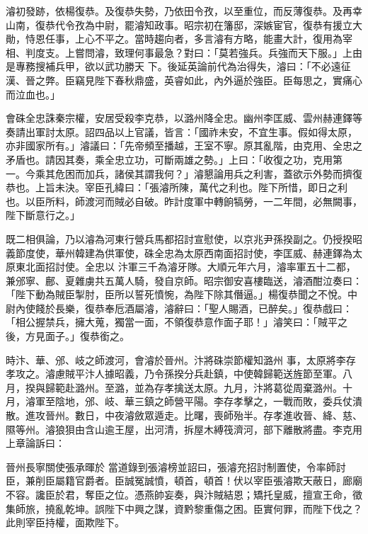 \begin{pinyinscope}
 濬初發跡，依楊復恭。及復恭失勢，乃依田令孜，以至重位，而反薄復恭。及再幸山南，復恭代令孜為中尉，罷濬知政事。昭宗初在籓邸，深嫉宦官，復恭有援立大勛，恃恩任事，上心不平之。當時趨向者，多言濬有方略，能畫大計，復用為宰相、判度支。上嘗問濬，致理何事最急？對曰：「莫若強兵。兵強而天下服。」上由是專務搜補兵甲，欲以武功勝天
 下。後延英論前代為治得失，濬曰：「不必遠征漢、晉之弊。臣竊見陛下春秋鼎盛，英睿如此，內外逼於強臣。臣每思之，實痛心而泣血也。」



 會硃全忠誅秦宗權，安居受殺李克恭，以潞州降全忠。幽州李匡威、雲州赫連鐸等奏請出軍討太原。詔四品以上官議，皆言：「國祚未安，不宜生事。假如得太原，亦非國家所有。」濬議曰：「先帝頻至播越，王室不寧。原其亂階，由克用、全忠之矛盾也。請因其奏，乘全忠立功，可斷兩雄之勢。」上曰：「收復之功，克用第
 一。今乘其危困而加兵，諸侯其謂我何？」濬懇論用兵之利害，蓋欲示外勢而擠復恭也。上旨未決。宰臣孔緯曰：「張濬所陳，萬代之利也。陛下所惜，即日之利也。以臣所料，師渡河而賊必自破。昨計度軍中轉餉犒勞，一二年間，必無闕事，陛下斷意行之。」



 既二相俱論，乃以濬為河東行營兵馬都招討宣慰使，以京兆尹孫揆副之。仍授揆昭義節度使，華州韓建為供軍使，硃全忠為太原西南面招討使，李匡威、赫連鐸為太原東北面招討使。全忠以
 汴軍三千為濬牙隊。大順元年六月，濬率軍五十二都，兼邠寧、鄜、夏雜虜共五萬人騎，發自京師。昭宗御安喜樓臨送，濬酒酣泣奏曰：「陛下動為賊臣掣肘，臣所以誓死憤惋，為陛下除其僭逼。」楊復恭聞之不悅。中尉內使餞於長樂，復恭奉卮酒屬濬，濬辭曰：「聖人賜酒，已醉矣。」復恭戲曰：「相公握禁兵，擁大蒐，獨當一面，不領復恭意作面子耶！」濬笑曰：「賊平之後，方見面子。」復恭銜之。



 時汴、華、邠、岐之師渡河，會濬於晉州。汴將硃崇節權知潞州
 事，太原將李存孝攻之。濬慮賊平汴人據昭義，乃令孫揆分兵赴鎮，中使韓歸範送旌節至軍。八月，揆與歸範赴潞州。至潞，並為存孝擒送太原。九月，汴將葛從周棄潞州。十月，濬軍至陰地，邠、岐、華三鎮之師營平陽。李存孝擊之，一戰而敗，委兵仗潰散。進攻晉州。數日，中夜濬斂眾遁走。比曙，喪師殆半。存孝進收晉、絳、慈、隰等州。濬狼狽由含山逾王屋，出河清，拆屋木縛筏濟河，部下離散將盡。李克用上章論訴曰：



 晉州長寧關使張承暉於
 當道錄到張濬榜並詔曰，張濬充招討制置使，令率師討臣，兼削臣屬籍官爵者。臣誠冤誠憤，頓首，頓首！伏以宰臣張濬欺天蔽日，廊廟不容。讒臣於君，奪臣之位。憑燕帥妄奏，與汴賊結恩；矯托皇威，擅宣王命，徵集師旅，撓亂乾坤。誤陛下中興之謀，資黔黎重傷之困。臣實何罪，而陛下伐之？此則宰臣持權，面欺陛下。




\end{pinyinscope}
